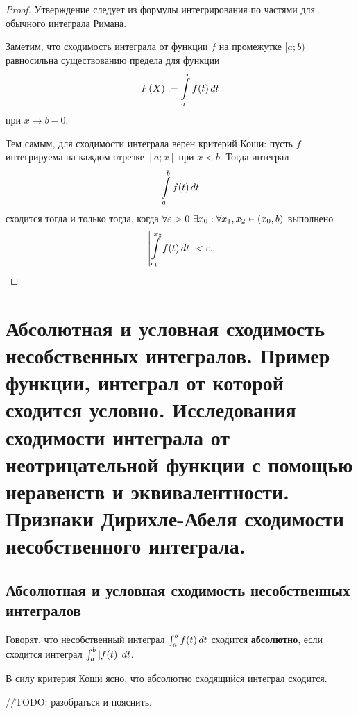 \documentclass[a4paper]{article}
\theoremstyle{named}
\renewcommand{\int}{\intop}
\begin{document}
        \begin{proof}
            Утверждение следует из формулы интегрирования по частями для обычного интеграла Римана.

            Заметим, что сходимость интеграла от функции $f$ на промежутке $[a; b)$ равносильна существованию предела для функции
            \begin{equation*}
                F(X) := \int_a^x f(t) \dd t
            \end{equation*}
            при $x \to b - 0$.

            Тем самым, для сходимости интеграла верен критерий Коши: пусть $f$ интегрируема на каждом отрезке $[a; x]$ при $x < b$. Тогда интеграл
            \begin{equation*}
                \int_a^b f(t) \dd t
            \end{equation*}
            сходится тогда и только тогда, когда $\forall \varepsilon > 0 \ \exists x_0: \forall x_1, x_2 \in (x_0, b)$ выполнено
            \begin{equation*}
                \left|\int_{x_1}^{x_2} f(t) \dd t\right| < \eps.
            \end{equation*}
        \end{proof}

    \section{Абсолютная и условная сходимость несобственных интегралов. Пример функции, интеграл от которой сходится условно. Исследования сходимости интеграла от неотрицательной функции с помощью неравенств и эквивалентности. Признаки Дирихле-Абеля сходимости несобственного интеграла.}

        \subsection{Абсолютная и условная сходимость несобственных интегралов}

        \begin{definition*}
            Говорят, что несобственный интеграл $\int_a^b f(t) \dd t$ сходится \textbf{абсолютно}, если сходится интеграл $\int_a^b |f(t)| \dd t$.
        \end{definition*}

        \begin{remark*}
            В силу критерия Коши ясно, что абсолютно сходящийся интеграл сходится.

            /\!/TODO: разобраться и пояснить.
        \end{remark*}
\end{document}

